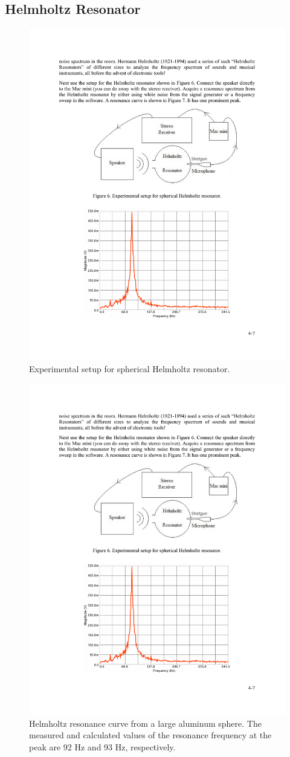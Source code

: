 \documentclass[11pt]{NSF}
\begin{document}
\subsection{Helmholtz Resonator}

%
\begin{figure}[hbtp]
\begin{center}
\includegraphics[width=.65\textwidth]{fig4_6}
\caption{Experimental setup for spherical Helmholtz resonator.}
\label{f:6} 
\end{center} 
\end{figure}
%

%
\begin{figure}[hbtp]
\begin{center}
\includegraphics[width=.7\textwidth]{fig4_7}
\caption{Helmholtz resonance curve from a large aluminum sphere. The measured
and calculated values of the resonance frequency at the peak are 92 Hz and 93
Hz, respectively.}
\label{f:7} 
\end{center} 
\end{figure}
%
\end{document}
